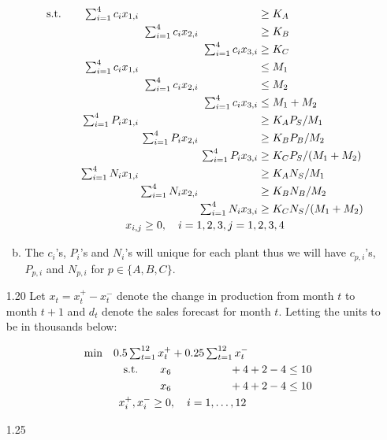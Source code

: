\documentclass[a4paper,10pt]{article}
\theoremstyle{definition}
\begin{document}
\begin{enumerate}
\begin{enumerate}[(a)]
\begin{align*}
\begin{array}{r@{}r@{}r@{}l}
    \text{s.t.}\qquad \sum_{i=1}^{4}c_ix_{1,i} &{} &{} &{}   \geq K_A\\ [\jot]
  &{}  \ \sum_{i=1}^{4}c_ix_{2,i}  &{} &{}   \geq K_B\\ [\jot]
 &{} &{}    \sum_{i=1}^{4}c_ix_{3,i}  &{}   \geq K_C\\ [\jot]
 \sum_{i=1}^{4}c_ix_{1,i} &{} &{} &{}   \leq M_1\\ [\jot]
  &{}  \ \sum_{i=1}^{4}c_ix_{2,i}  &{} &{}   \leq M_2\\ [\jot]
 &{} &{}    \sum_{i=1}^{4}c_ix_{3,i}  &{}   \leq M_1+M_2\\ [\jot]
 \sum_{i=1}^{4}P_ix_{1,i} &{} &{} &{}   \geq K_AP_S/M_1\\ [\jot]
  &{}  \sum_{i=1}^{4}P_ix_{2,i}  &{} &{}   \geq K_BP_B/M_2\\ [\jot]
 &{} &{}   \sum_{i=1}^{4}P_ix_{3,i}  &{}   \geq K_CP_S/(M_1+M_2)\\ [\jot]
 \sum_{i=1}^{4}N_ix_{1,i} &{} &{} &{}   \geq K_AN_S/M_1\\ [\jot]
  &{}   \sum_{i=1}^{4}N_ix_{2,i}  &{} &{}   \geq K_BN_B/M_2\\ [\jot]
 &{} &{}    \sum_{i=1}^{4}N_ix_{3,i}  &{}   \geq K_CN_S/(M_1+M_2)\\ [\jot]               
 \multicolumn{4}{c}{x_{i,j} \geq 0, \quad i=1,2,3, j=1,2,3,4}
  \end{array}
\end{align*}

\item The $c_i$'s, $P_i$'s and $N_i$'s will unique for each plant thus we will have $c_{p,i}$'s, $P_{p,i}$ and $N_{p,i}$ for $p \in \{A, B, C\}$.
\end{enumerate}
\item[1.20] Let $x_t = x_t^+-x_t^-$ denote the change in production from month $t$ to month $t+1$ and $d_t$ denote the sales forecast for month $t$. Letting the units to be in thousands below:

\begin{align*}
  \begin{array}{r@{}r@{}r@{}r@{}r@{}l}
    \text{min} \quad 0.5\sum_{t=1}^{12}x_t^+ &{} + 0.25\sum_{t=1}^{12}x_t^-&{}&{}&{} \\[\jot]
    \text{s.t.}\qquad x_6 &{}+4&{} +2 &{}  -4 &{}  \leq 10\\ [\jot]      
    x_6 &{}+4&{} +2 &{}  -4 &{}  \leq 10\\ [\jot]     
 \multicolumn{4}{c}{x_i^+, x_i^- \geq 0, \quad i=1,\ldots,12}
  \end{array}
\end{align*}
\item[1.25]
\end{enumerate}
\end{document}

